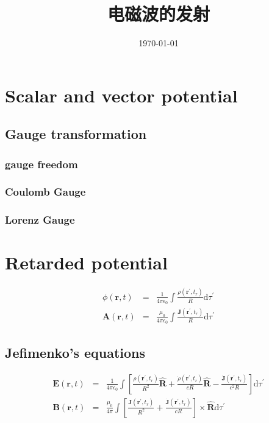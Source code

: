 \documentclass[12pt,a4paper]{article}
\title{电磁波的发射}
\author{}
\date{\today}
\renewcommand{\vec}[1]{\boldsymbol{#1}}
\newcommand{\dif}{\mathrm{d}}
\begin{document}
\maketitle
\section{Scalar and vector potential}

\subsection{Gauge transformation}
\subsubsection{gauge freedom}

\subsubsection{Coulomb Gauge}


\subsubsection{Lorenz Gauge}

\section{Retarded potential}
\begin{eqnarray}
\phi(\vec{r}, t) &=& \frac{1}{4\pi \epsilon_0} \int \frac{\rho(\vec{r}^{\prime}, t_r)}{R} \dif \tau^{\prime} \\
\vec{A}(\vec{r}, t) &=& \frac{\mu_0}{4\pi \epsilon_0} \int \frac{\vec{J}(\vec{r}^{\prime}, t_r)}{R} \dif \tau^{\prime}
\end{eqnarray}

\subsection{Jefimenko's equations}
\begin{eqnarray}
\vec{E}(\vec{r}, t) &=& \frac{1}{4\pi \epsilon_0} \int \left[\frac{\rho(\vec{r}^{\prime}, t_r)}{R^2}\vec{\hat{R}} +\frac{\dot\rho(\vec{r}^{\prime}, t_r)}{cR}\vec{\hat{R}} -\frac{\vec{\dot J}(\vec{r}^{\prime}, t_r)}{c^2 R}  \right] \dif \tau^{\prime} \\
\vec{B}(\vec{r}, t) &=& \frac{\mu_0}{4\pi} \int \left[\frac{\vec{J}(\vec{r}^{\prime}, t_r)}{R^2} +\frac{\vec{\dot J}(\vec{r}^{\prime}, t_r)}{c R} \right] \times \vec{\hat R} \dif \tau^{\prime}
\end{eqnarray}
\end{document}

